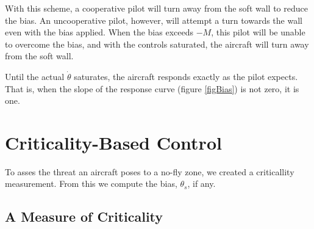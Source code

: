 \documentclass[11pt]{article}
\begin{document}
With this scheme, a cooperative pilot will turn away from the soft
wall to reduce the bias.  An uncooperative pilot, however, will
attempt a turn towards the wall even with the bias applied.  When the
bias exceeds $-M$, this pilot will be unable to overcome the bias, and
with the controls saturated, the aircraft will turn away from the soft
wall.

Until the actual $\dot{\theta}$ saturates, the aircraft responds
exactly as the pilot expects.  That is, when the slope of the response
curve (figure \ref{figBias}) is not zero, it is one.


\section{Criticality-Based Control}

To asses the threat an aircraft poses to a no-fly zone, we created a
criticallity measurement.  From this we compute the bias, $\theta_s$,
if any.


\subsection{A Measure of Criticality}
\end{document}
